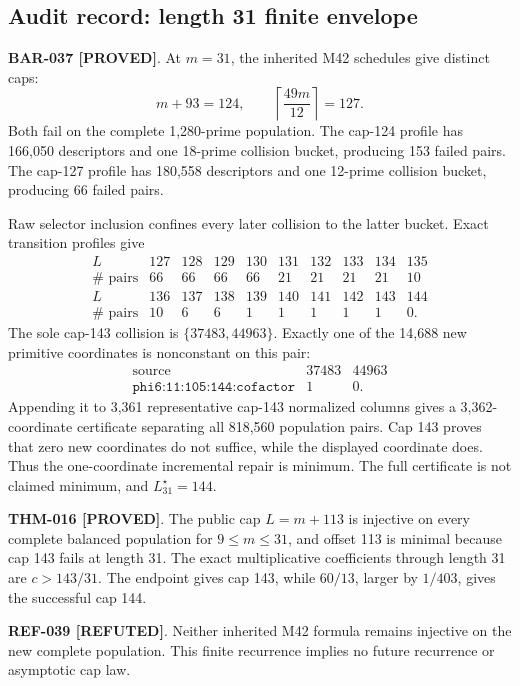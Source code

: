 \documentclass[11pt]{article}
\newcommand{\claimstatus}[2]{\textbf{#1 [#2]}}
\begin{document}
\subsection{Audit record: length 31 finite envelope}

\claimstatus{BAR-037}{PROVED}. At \(m=31\), the inherited M42 schedules give
distinct caps:
\[
m+93=124,\qquad
\left\lceil\frac{49m}{12}\right\rceil=127.
\]
Both fail on the complete 1,280-prime population. The cap-124 profile has
166,050 descriptors and one 18-prime collision bucket, producing 153 failed
pairs. The cap-127 profile has 180,558 descriptors and one 12-prime
collision bucket, producing 66 failed pairs.

Raw selector inclusion confines every later collision to the latter bucket.
Exact transition profiles give
\[
\begin{array}{c|rrrrrrrrr}
L&127&128&129&130&131&132&133&134&135\\
\hline
\#\text{ pairs}&66&66&66&66&21&21&21&21&10
\end{array}
\]
\[
\begin{array}{c|rrrrrrrrr}
L&136&137&138&139&140&141&142&143&144\\
\hline
\#\text{ pairs}&10&6&6&1&1&1&1&1&0.
\end{array}
\]
The sole cap-143 collision is \(\{37483,44963\}\). Exactly one of the
14,688 new primitive coordinates is nonconstant on this pair:
\[
\begin{array}{c|rr}
\text{source}&37483&44963\\
\hline
\texttt{phi6:11:105:144:cofactor}&1&0.
\end{array}
\]
Appending it to 3,361 representative cap-143 normalized columns gives a
3,362-coordinate certificate separating all 818,560 population pairs.
Cap 143 proves that zero new coordinates do not suffice, while the displayed
coordinate does. Thus the one-coordinate incremental repair is minimum.
The full certificate is not claimed minimum, and \(L_{31}^{\star}=144\).

\claimstatus{THM-016}{PROVED}. The public cap \(L=m+113\) is injective on
every complete balanced population for \(9\le m\le31\), and offset 113 is
minimal because cap 143 fails at length 31. The exact multiplicative
coefficients through length 31 are \(c>143/31\). The endpoint gives cap 143,
while \(60/13\), larger by \(1/403\), gives the successful cap 144.

\claimstatus{REF-039}{REFUTED}. Neither inherited M42 formula remains
injective on the new complete population. This finite recurrence implies no
future recurrence or asymptotic cap law.
\end{document}
